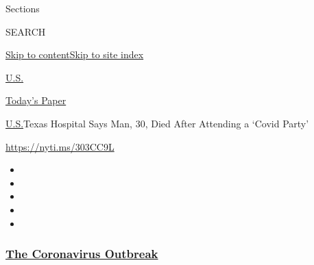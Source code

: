 Sections

SEARCH

\protect\hyperlink{site-content}{Skip to
content}\protect\hyperlink{site-index}{Skip to site index}

\href{https://www.nytimes3xbfgragh.onion/section/us}{U.S.}

\href{https://myaccount.nytimes3xbfgragh.onion/auth/login?response_type=cookie\&client_id=vi}{}

\href{https://www.nytimes3xbfgragh.onion/section/todayspaper}{Today's
Paper}

\href{/section/us}{U.S.}\textbar{}Texas Hospital Says Man, 30, Died
After Attending a `Covid Party'

\url{https://nyti.ms/303CC9L}

\begin{itemize}
\item
\item
\item
\item
\item
\end{itemize}

\hypertarget{the-coronavirus-outbreak}{%
\subsubsection{\texorpdfstring{\href{https://www.nytimes3xbfgragh.onion/news-event/coronavirus?name=styln-coronavirus-national\&region=TOP_BANNER\&block=storyline_menu_recirc\&action=click\&pgtype=Article\&impression_id=b1e7f150-f52e-11ea-bf53-6d1183b5f58a\&variant=undefined}{The
Coronavirus
Outbreak}}{The Coronavirus Outbreak}}\label{the-coronavirus-outbreak}}

